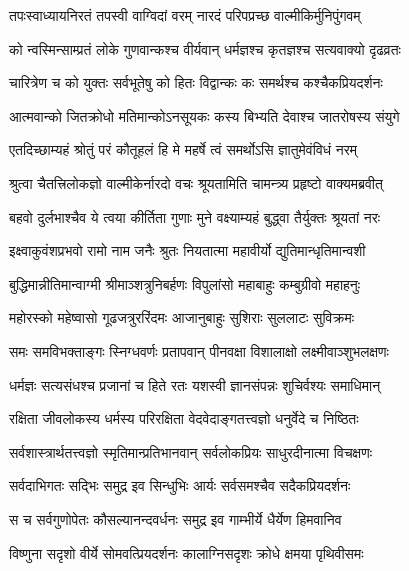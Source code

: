 

\twolineshloka
{तपःस्वाध्यायनिरतं तपस्वी वाग्विदां वरम्}
{नारदं परिपप्रच्छ वाल्मीकिर्मुनिपुंगवम्} %

\twolineshloka
{को न्वस्मिन्साम्प्रतं लोके गुणवान्कश्च वीर्यवान्}
{धर्मज्ञश्च कृतज्ञश्च सत्यवाक्यो दृढव्रतः} %

\twolineshloka
{चारित्रेण च को युक्तः सर्वभूतेषु को हितः}
{विद्वान्कः कः समर्थश्च कश्चैकप्रियदर्शनः} %

\twolineshloka
{आत्मवान्को जितक्रोधो मतिमान्कोऽनसूयकः}
{कस्य बिभ्यति देवाश्च जातरोषस्य संयुगे} %

\twolineshloka
{एतदिच्छाम्यहं श्रोतुं परं कौतूहलं हि मे}
{महर्षे त्वं समर्थोऽसि ज्ञातुमेवंविधं नरम्} %

\twolineshloka
{श्रुत्वा चैतत्त्रिलोकज्ञो वाल्मीकेर्नारदो वचः}
{श्रूयतामिति चामन्त्र्य प्रहृष्टो वाक्यमब्रवीत्} %

\twolineshloka
{बहवो दुर्लभाश्चैव ये त्वया कीर्तिता गुणाः}
{मुने वक्ष्याम्यहं बुद्ध्वा तैर्युक्तः श्रूयतां नरः} %

\twolineshloka
{इक्ष्वाकुवंशप्रभवो रामो नाम जनैः श्रुतः}
{नियतात्मा महावीर्यो द्युतिमान्धृतिमान्वशी} %

\twolineshloka
{बुद्धिमान्नीतिमान्वाग्मी श्रीमाञ्शत्रुनिबर्हणः}
{विपुलांसो महाबाहुः कम्बुग्रीवो महाहनुः} %

\twolineshloka
{महोरस्को महेष्वासो गूढजत्रुररिंदमः}
{आजानुबाहुः सुशिराः सुललाटः सुविक्रमः} %

\twolineshloka
{समः समविभक्ताङ्गः स्निग्धवर्णः प्रतापवान्}
{पीनवक्षा विशालाक्षो लक्ष्मीवाञ्शुभलक्षणः} %

\twolineshloka
{धर्मज्ञः सत्यसंधश्च प्रजानां च हिते रतः}
{यशस्वी ज्ञानसंपन्नः शुचिर्वश्यः समाधिमान्} %

\twolineshloka
{रक्षिता जीवलोकस्य धर्मस्य परिरक्षिता}
{वेदवेदाङ्गतत्त्वज्ञो धनुर्वेदे च निष्ठितः} %

\twolineshloka
{सर्वशास्त्रार्थतत्त्वज्ञो स्मृतिमान्प्रतिभानवान्}
{सर्वलोकप्रियः साधुरदीनात्मा विचक्षणः} %

\twolineshloka
{सर्वदाभिगतः सद्भिः समुद्र इव सिन्धुभिः}
{आर्यः सर्वसमश्चैव सदैकप्रियदर्शनः} %

\twolineshloka
{स च सर्वगुणोपेतः कौसल्यानन्दवर्धनः}
{समुद्र इव गाम्भीर्ये धैर्येण हिमवानिव} %

\twolineshloka
{विष्णुना सदृशो वीर्ये सोमवत्प्रियदर्शनः}
{कालाग्निसदृशः क्रोधे क्षमया पृथिवीसमः} %

